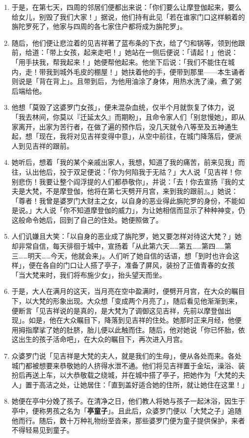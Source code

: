 \begin{enumerate}
\item 于是，在第七天，四周的邻居们便都出来说：「你们要么让摩登伽起来，要么给女儿，别毁了我们大家！」据说，他们持有此见「若在谁家门口这样躺着的旃陀罗死了，他家与四周的各七家住户都将成为旃陀罗」。
\item 随后，他们便让悲泣着的见吉祥著了蓝布条的下衣，给了勺和锅等，领到他跟前，给道：「带上女孩，起来走吧！」她站在一侧后便说：「请起！」他说：「用手扶我，帮我起来！」她便帮他起来。他坐下后说：「我们不能住在城内，走！带我到城外毛皮的棚屋！」她扶着他的手，便带到那里——本生诵者则说是「背在背上」。且带到后，为他用油涂了身体，用热水洗了澡，煮了粥后端给他。
\item 他想「莫毁了这婆罗门女孩」，便未混杂血统，仅半个月就恢复了体力，说「我去林间，你莫以『迁延太久』而期盼」，且命令家人们「别怠慢她」，即从家离开，出家为苦行者，在做了遍的预作后，没几天就令八等至及五神通生起，想「现在，我将对见吉祥变得中意」，从空中前往，在城门降落后，便派人到见吉祥的跟前。
\item 她听后，想着「我的某个亲戚出家人，我想，知道了我的痛苦，前来见我」而往，认出他后，投于双足便说：「你为何陷我于无祜？」大人说「见吉祥！你别悲伤！我要让整个阎浮提的人们都恭敬你」，并说：「去！你去宣扬『我的丈夫是大梵，不是摩登伽，他将在第七天劈开月宫，来到我的跟前』。」她说：「尊者！我曾是婆罗门大财主之女，以自身的恶业得此旃陀罗的身份，不能如是说。」大人说「你不知道摩登伽的威力」，为让她相信而显示了种种神变，仍这般命令她后，回到了自己的住处。她便照做了。
\item 人们讥嫌且大笑：「以自身的恶业成了旃陀罗，她又要怎样对待这大梵？」她却非常自信，每天徘徊于城中，宣扬着「从此第六天……第五……第四……第三……明天……今天，他就会来」。人们听了她自信的话语，想「到时也许会这样」，便在各自的门口让人搭了亭子，准备了屏风，装扮了正值青春的女孩「当大梵来时，我们将布施少女」，抬头望天而坐。
\item 于是，大人在满月的这天，当月亮在空中盈满时，便劈开月宫，在大众的瞩目下，以大梵的形象出现。大众想「变成两个月亮了」，随后看见他渐渐到来，便断言「见吉祥说的是真的，是大梵为了调御这见吉祥，先前以摩登伽出现」。如是，他在大众瞩目下，降落到见吉祥的住处。她那时正来月经，他便用拇指摩挲了她的肚脐，胎儿便以此触而住。随后，他对她说「你已怀胎，依这出生的孩子活命吧」，在大众的瞩目下，再次进入月宫。
\item 众婆罗门说「见吉祥是大梵的夫人，就是我们的生母」，便从各处而来。各处城门都被想要来恭敬她的人挤得水泄不通。他们将见吉祥置于金坛，澡浴、装扮后再送上车，以大恭敬载之绕城，并在城中搭了亭子，把她作为「大梵的夫人」置于高洁之处，让她居住：「直到盖好适合她的住所，就让她住在这里！」
\item 她便在亭中分娩了孩子。在清净之日，他们教人将她与孩子一起沐浴，因生于亭中，便称男孩之名为「\textbf{亭童子}」。且此后，众婆罗门便以「大梵之子」追随他而行。随后，数十万种礼物纷至沓来，那些婆罗门便为童子提供保护，来者不得轻易见到童子。

\end{enumerate}
